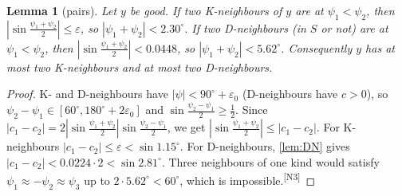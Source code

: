 \documentclass[11pt]{amsart}
\newtheorem{lemma}[theorem]{Lemma}
\theoremstyle{definition}
\theoremstyle{remark}
\newcommand{\eps}{\varepsilon}
\newcommand{\chk}[1]{\textsuperscript{[#1]}}
\begin{document}
\begin{lemma}[pairs]\label{lem:pairs}
Let $y$ be good. If two K-neighbours of $y$ are at $\psi_1<\psi_2$, then $|\sin\frac{\psi_1+\psi_2}2|\le\eps$, so $|\psi_1+\psi_2|<2.30^\circ$. If two D-neighbours (in $S$ or not) are at $\psi_1<\psi_2$, then $|\sin\frac{\psi_1+\psi_2}2|<0.0448$, so $|\psi_1+\psi_2|<5.62^\circ$. Consequently $y$ has at most two K-neighbours and at most two D-neighbours.
\end{lemma}
\begin{proof}
K- and D-neighbours have $|\psi|<90^\circ+\eps_0$ (D-neighbours have $c>0$), so $\psi_2-\psi_1\in[60^\circ,180^\circ+2\eps_0]$ and $\sin\frac{\psi_2-\psi_1}2\ge\frac12$. Since $|c_1-c_2|=2|\sin\frac{\psi_1+\psi_2}2|\sin\frac{\psi_2-\psi_1}2$, we get $|\sin\frac{\psi_1+\psi_2}2|\le|c_1-c_2|$. For K-neighbours $|c_1-c_2|\le\eps<\sin1.15^\circ$. For D-neighbours, \cref{lem:DN} gives $|c_1-c_2|<0.0224\cdot2<\sin2.81^\circ$. Three neighbours of one kind would satisfy $\psi_1\approx-\psi_2\approx\psi_3$ up to $2\cdot5.62^\circ<60^\circ$, which is impossible.\chk{N3}
\end{proof}
\end{document}
